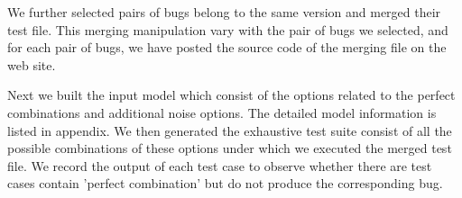 \documentclass{sig-alternate}
\begin{document}
We further selected pairs of bugs belong to the same version and merged their test file. This merging manipulation vary with the pair of bugs we selected, and for each pair of bugs, we have posted the source code of the merging file on the web site.


Next we built the input model which consist of the options related to the perfect combinations and additional noise options. The detailed model information is listed in appendix. We then generated the exhaustive test suite consist of all the possible combinations of these options under which we executed the merged test file. We record the output of each test case to observe whether there are test cases contain 'perfect combination' but do not produce the corresponding bug.
\end{document}

